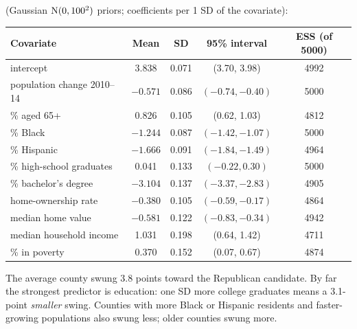 \documentclass[11pt]{article}
\begin{document}
 (Gaussian $\mathrm{N}(0,100^2)$ priors; coefficients per 1 SD of the covariate):
\begin{center}
\small
\begin{tabular}{lcccc}\toprule
Covariate & Mean & SD & 95\% interval & ESS (of 5000)\\\midrule
intercept & 3.838 & 0.071 & (3.70, 3.98) & 4992\\
population change 2010--14 & $-0.571$ & 0.086 & $(-0.74,-0.40)$ & 5000\\
\% aged 65+ & 0.826 & 0.105 & (0.62, 1.03) & 4812\\
\% Black & $-1.244$ & 0.087 & $(-1.42,-1.07)$ & 5000\\
\% Hispanic & $-1.666$ & 0.091 & $(-1.84,-1.49)$ & 4964\\
\% high-school graduates & 0.041 & 0.133 & $(-0.22, 0.30)$ & 5000\\
\% bachelor's degree & $\mathbf{-3.104}$ & 0.137 & $(-3.37,-2.83)$ & 4905\\
home-ownership rate & $-0.380$ & 0.105 & $(-0.59,-0.17)$ & 4864\\
median home value & $-0.581$ & 0.122 & $(-0.83,-0.34)$ & 4942\\
median household income & 1.031 & 0.198 & (0.64, 1.42) & 4711\\
\% in poverty & 0.370 & 0.152 & (0.07, 0.67) & 4874\\\bottomrule
\end{tabular}
\end{center}
The average county swung 3.8 points toward the Republican candidate. By far the strongest predictor is education: one SD more college graduates means a 3.1-point \emph{smaller} swing. Counties with more Black or Hispanic residents and faster-growing populations also swung less; older counties swung more.
\end{document}

